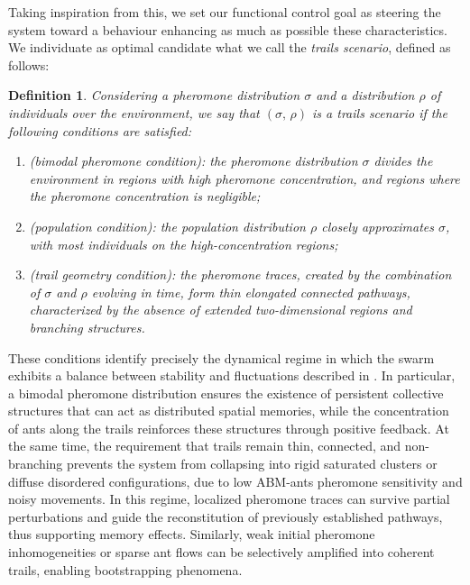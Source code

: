 \documentclass[openacc]{rsproca_new}%
\newtheorem{definition}{\bf Definition}[section]
\begin{document}
Taking inspiration from this, we set our functional control goal as steering the system toward a behaviour enhancing as much as possible these characteristics. We individuate as optimal candidate what we call the \emph{trails scenario}, defined as follows:
\begin{definition}
\label{def:ants-trail-scenario}
Considering a pheromone distribution $\sigma$ and a distribution $\rho$ of individuals over the environment, we say that $(\sigma, \, \rho)$ is a \emph{trails scenario} if the following conditions are satisfied:
\begin{enumerate}
    \item (\textit{bimodal pheromone condition}): the pheromone distribution $\sigma$ divides the environment in regions with high pheromone concentration, and regions where the pheromone concentration is negligible;

    \item (\textit{population condition}): the population distribution $\rho$ closely approximates $\sigma$, with most individuals on the high-concentration regions;

    \item (\textit{trail geometry condition}): the pheromone traces, created by the combination of $\sigma$ and $\rho$ evolving in time, form thin elongated connected pathways, characterized by the absence of extended two-dimensional regions and branching structures.
\end{enumerate}
\end{definition}
These conditions identify precisely the dynamical regime in which the swarm exhibits a balance between stability and fluctuations described in \cite{patternformation}. In particular, a bimodal pheromone distribution ensures the existence of persistent collective structures that can act as distributed spatial memories, while the concentration of ants along the trails reinforces these structures through positive feedback. At the same time, the requirement that trails remain thin, connected, and non-branching prevents the system from collapsing into rigid saturated clusters or diffuse disordered configurations, due to low ABM-ants pheromone sensitivity and noisy movements. In this regime, localized pheromone traces can survive partial perturbations and guide the reconstitution of previously established pathways, thus supporting memory effects. Similarly, weak initial pheromone inhomogeneities or sparse ant flows can be selectively amplified into coherent trails, enabling bootstrapping phenomena. 
\end{document}
